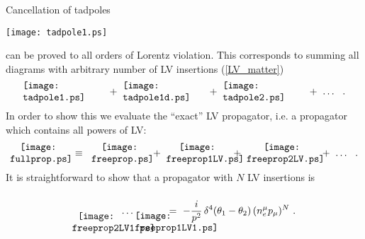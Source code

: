 \documentclass[12pt]{revtex4}
\begin{document}
Cancellation of tadpoles 
\begin{center}
\texttt{[image: tadpole1.ps]}
\end{center}
can be proved to all orders of Lorentz violation.
This corresponds to summing all diagrams with arbitrary
number of LV insertions (\ref{LV_matter})
\begin{equation}
\label{full_tadpole}
\begin{minipage}[c]{3.0cm}
\texttt{[image: tadpole1.ps]} 
\end{minipage}
   +~
\begin{minipage}[c]{3.0cm}
\texttt{[image: tadpole1d.ps]} 
\end{minipage}
   +~
\begin{minipage}[c]{3.0cm}
\texttt{[image: tadpole2.ps]} 
\end{minipage}
   +~
   \ldots
   ~~.
\end{equation}
In order to show this we evaluate the ``exact'' LV 
propagator, i.e. a propagator which contains all powers
of LV:
\begin{equation}
\label{def_full_prop}
\begin{minipage}[c]{2.0cm}
\centering
\texttt{[image: fullprop.ps]} 
\end{minipage}
    \;~\equiv~\;
\begin{minipage}[c]{2.0cm}
\centering
\texttt{[image: freeprop.ps]} 
\end{minipage}
    ~+~
\begin{minipage}[c]{2.2cm}
\centering
\texttt{[image: freeprop1LV.ps]} 
\end{minipage}
    ~+~
\begin{minipage}[c]{2.5cm}
\centering
\texttt{[image: freeprop2LV.ps]} 
\end{minipage}
    ~+~
    \ldots
    ~~.
\end{equation}
It is straightforward to show that a propagator with $ N $
LV insertions is
\begin{equation}
\label{N_LV_prop}
\begin{minipage}[c]{1.7cm}
\vspace{0.8cm}
\centering
\texttt{[image: freeprop2LV1.ps]}
\end{minipage}
\ldots
\begin{minipage}[c]{1.0cm}
\vspace{0.78cm}
\centering
\texttt{[image: freeprop1LV1.ps]} 
\end{minipage}
~=~ 
- \frac{i}{p^2}\, \delta^4(\theta_1 - \theta_2)\,
    (n_e^\mu p_\mu)^N  
~.
\end{equation}
\end{document}
